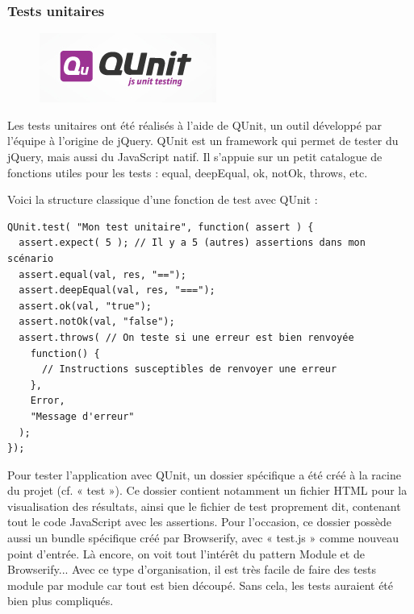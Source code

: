 \documentclass[a4paper,12pt]{article}
\begin{document}
\subsubsection{Tests unitaires}

\begin{figure}[!h]
  \begin{center}
    \includegraphics[scale=0.7]{logo-qunit.png}
  \end{center}
\end{figure}

Les tests unitaires ont été réalisés à l'aide de QUnit, un outil développé par l'équipe à l'origine de jQuery. QUnit est un framework qui permet de tester du jQuery, mais aussi du JavaScript natif. Il s'appuie sur un petit catalogue de fonctions utiles pour les tests : equal, deepEqual, ok, notOk, throws, etc.

Voici la structure classique d'une fonction de test avec QUnit :

\begin{lstlisting}
QUnit.test( "Mon test unitaire", function( assert ) {
  assert.expect( 5 ); // Il y a 5 (autres) assertions dans mon scénario
  assert.equal(val, res, "==");
  assert.deepEqual(val, res, "===");
  assert.ok(val, "true");
  assert.notOk(val, "false");
  assert.throws( // On teste si une erreur est bien renvoyée
    function() {
      // Instructions susceptibles de renvoyer une erreur
    },
    Error,
    "Message d'erreur"
  );
});
\end{lstlisting}

Pour tester l'application avec QUnit, un dossier spécifique a été créé à la racine du projet (cf. « test »). Ce dossier contient notamment un fichier HTML pour la visualisation des résultats, ainsi que le fichier de test proprement dit, contenant tout le code JavaScript avec les assertions. Pour l'occasion, ce dossier possède aussi un bundle spécifique créé par Browserify, avec « test.js » comme nouveau point d'entrée. Là encore, on voit tout l'intérêt du pattern Module et de Browserify... Avec ce type d'organisation, il est très facile de faire des tests module par module car tout est bien découpé. Sans cela, les tests auraient été bien plus compliqués.
\end{document}
